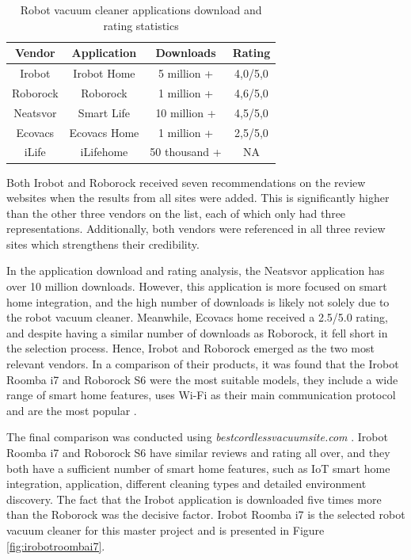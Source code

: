 \begin{table}[H]
\centering
\caption{Robot vacuum cleaner applications download and rating statistics}
\label{tab:VendorApplicationStat}
\begin{tabular}{|c|c|c|c|}
\hline
\textbf{Vendor} & \textbf{Application} & \textbf{Downloads} & \textbf{Rating} \\ \hline
Irobot          & Irobot Home          & 5 million +        & 4,0/5,0         \\ \hline
Roborock        & Roborock             & 1 million +        & 4,6/5,0         \\ \hline
Neatsvor        & Smart Life           & 10 million +       & 4,5/5,0         \\ \hline
Ecovacs         & Ecovacs Home         & 1 million +        & 2,5/5,0         \\ \hline
iLife           & iLifehome            & 50 thousand +      & NA              \\ \hline
\end{tabular}
\end{table}
Both Irobot and Roborock received seven recommendations on the review websites when the results from all sites were added. This is significantly higher than the other three vendors on the list, each of which only had three representations. Additionally, both vendors were referenced in all three review sites which strengthens their credibility. 

In the application download and rating analysis, the Neatsvor application has over 10 million downloads. However, this application is more focused on smart home integration, and the high number of downloads is likely not solely due to the robot vacuum cleaner. Meanwhile, Ecovacs home received a 2.5/5.0 rating, and despite having a similar number of downloads as Roborock, it fell short in the selection process. Hence, Irobot and Roborock emerged as the two most relevant vendors. In a comparison of their products, it was found that the Irobot Roomba i7 and Roborock S6 were the most suitable models, they include a wide range of smart home features, uses \gls{Wi-Fi} as their main communication protocol and are the most popular \cite{robotsel8} \cite{robotsel6}. 

The final comparison was conducted using \textit{bestcordlessvacuumsite.com} \cite{robotsel9}. Irobot Roomba i7 and Roborock S6 have similar reviews and rating all over, and they both have a sufficient number of smart home features, such as \gls{IoT} smart home integration, application, different cleaning types and detailed environment discovery. The fact that the Irobot application is downloaded five times more than the Roborock was the decisive factor. Irobot Roomba i7 is the selected robot vacuum cleaner for this master project and is presented in Figure \ref{fig:irobotroombai7}. 

